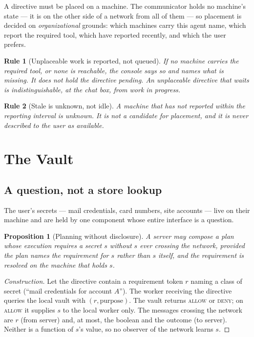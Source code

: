 \documentclass[11pt]{article}
\newtheorem{drule}{Rule}
\newtheorem{proposition}{Proposition}
\begin{document}
A directive must be placed on a machine. The communicator holds no machine's state --- it is on the other side of a network from all of them --- so placement is decided on \emph{organizational} grounds: which machines carry this agent name, which report the required tool, which have reported recently, and which the user prefers.

\begin{drule}[Unplaceable work is reported, not queued]
\label{rule:noqueue}
If no machine carries the required tool, or none is reachable, the console says so and names what is missing. It does not hold the directive pending. An unplaceable directive that waits is indistinguishable, at the chat box, from work in progress.
\end{drule}

\begin{drule}[Stale is unknown, not idle]
\label{rule:stale}
A machine that has not reported within the reporting interval is \emph{unknown}. It is not a candidate for placement, and it is never described to the user as available.
\end{drule}

\section{The Vault}
\label{sec:vault}

\subsection{A question, not a store lookup}

The user's secrets --- mail credentials, card numbers, site accounts --- live on their machine and are held by one component whose entire interface is a question.

\begin{proposition}[Planning without disclosure]
\label{prop:vault}
A server may compose a plan whose execution requires a secret $s$ without $s$ ever crossing the network, provided the plan names the \emph{requirement} for $s$ rather than $s$ itself, and the requirement is resolved on the machine that holds $s$.
\end{proposition}

\begin{proof}[Construction]
Let the directive contain a requirement token $r$ naming a class of secret (``mail credentials for account $A$''). The worker receiving the directive queries the local vault with $(r, \text{purpose})$. The vault returns \textsc{allow} or \textsc{deny}; on \textsc{allow} it supplies $s$ to the local worker only. The messages crossing the network are $r$ (from server) and, at most, the boolean and the outcome (to server). Neither is a function of $s$'s value, so no observer of the network learns $s$.
\end{proof}
\end{document}
